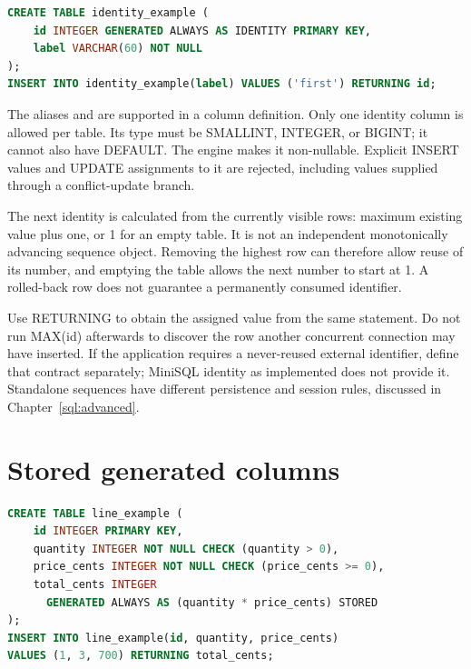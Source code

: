 \begin{lstlisting}[language=SQL]
CREATE TABLE identity_example (
    id INTEGER GENERATED ALWAYS AS IDENTITY PRIMARY KEY,
    label VARCHAR(60) NOT NULL
);
INSERT INTO identity_example(label) VALUES ('first') RETURNING id;
\end{lstlisting}

The aliases  and  are supported in a column definition. Only one identity column is allowed per table. Its type must be SMALLINT, INTEGER, or BIGINT; it cannot also have DEFAULT. The engine makes it non-nullable. Explicit INSERT values and UPDATE assignments to it are rejected, including values supplied through a conflict-update branch.

The next identity is calculated from the currently visible rows: maximum existing value plus one, or 1 for an empty table. It is not an independent monotonically advancing sequence object. Removing the highest row can therefore allow reuse of its number, and emptying the table allows the next number to start at 1. A rolled-back row does not guarantee a permanently consumed identifier.

Use RETURNING to obtain the assigned value from the same statement. Do not run MAX(id) afterwards to discover the row another concurrent connection may have inserted. If the application requires a never-reused external identifier, define that contract separately; MiniSQL identity as implemented does not provide it. Standalone sequences have different persistence and session rules, discussed in Chapter~\ref{sql:advanced}.


\section{Stored generated columns}

\begin{lstlisting}[language=SQL]
CREATE TABLE line_example (
    id INTEGER PRIMARY KEY,
    quantity INTEGER NOT NULL CHECK (quantity > 0),
    price_cents INTEGER NOT NULL CHECK (price_cents >= 0),
    total_cents INTEGER
      GENERATED ALWAYS AS (quantity * price_cents) STORED
);
INSERT INTO line_example(id, quantity, price_cents)
VALUES (1, 3, 700) RETURNING total_cents;
\end{lstlisting}

